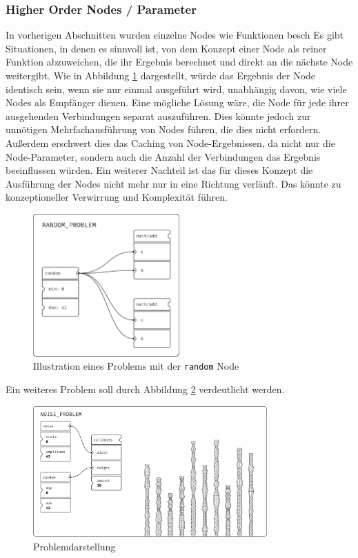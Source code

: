\documentclass[ngerman]{article}
\begin{document}
\subsubsection{Higher Order Nodes / Parameter}
\label{sec:HON}
\br
In vorherigen Abschnitten wurden einzelne Nodes wie Funktionen besch
Es gibt Situationen, in denen es sinnvoll ist, von dem Konzept einer Node als reiner Funktion abzuweichen, die ihr Ergebnis berechnet und direkt an die nächste Node weitergibt.
\br
Wie in Abbildung \ref{fig:random_problem} dargestellt, würde das Ergebnis der  Node identisch sein, wenn sie nur einmal ausgeführt wird, unabhängig davon, wie viele  Nodes als Empfänger dienen. 
Eine mögliche Lösung wäre, die  Node für jede ihrer ausgehenden Verbindungen separat auszuführen. 
Dies könnte jedoch zur unnötigen Mehrfachausführung von Nodes führen, die dies nicht erfordern.
Außerdem erschwert dies das Caching von Node-Ergebnissen, da nicht nur die Node-Parameter, sondern auch die Anzahl der Verbindungen das Ergebnis beeinflussen würden.
\br
Ein weiterer Nachteil ist das für dieses Konzept die Ausführung der Nodes nicht mehr nur in eine Richtung verläuft. Das könnte zu konzeptioneller Verwirrung und Komplexität führen.
\br
\begin{figure}[htbp]
  \centering
  \includegraphics[width=0.5\textwidth]{graphics/RANDOM_PROBLEM.pdf}
  \caption{Illustration eines Problems mit der \texttt{random} Node}
  \label{fig:random_problem}
\end{figure}

\pagebreak

Ein weiteres Problem soll durch Abbildung \ref{fig:noise_problem} verdeutlicht werden.

\begin{figure}[htbp]
  \centering
  \includegraphics[width=0.8\textwidth]{./graphics/NOISE_PROBLEM.pdf}
  \caption{Problemdarstellung}
  \label{fig:noise_problem}
\end{figure}
\end{document}
